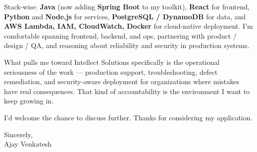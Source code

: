 \documentclass[letterpaper,11pt]{article}
\begin{document}
Stack-wise: \textbf{Java} (now adding \textbf{Spring Boot} to my toolkit), \textbf{React} for frontend, \textbf{Python} and \textbf{Node.js} for services, \textbf{PostgreSQL / DynamoDB} for data, and \textbf{AWS Lambda, IAM, CloudWatch, Docker} for cloud-native deployment. I'm comfortable spanning frontend, backend, and ops, partnering with product / design / QA, and reasoning about reliability and security in production systems.

What pulls me toward Intellect Solutions specifically is the operational seriousness of the work --- production support, troubleshooting, defect remediation, and security-aware deployment for organizations where mistakes have real consequences. That kind of accountability is the environment I want to keep growing in.

I'd welcome the chance to discuss further. Thanks for considering my application.

\vspace{12pt}

Sincerely, \\
Ajay Venkatesh
\end{document}
